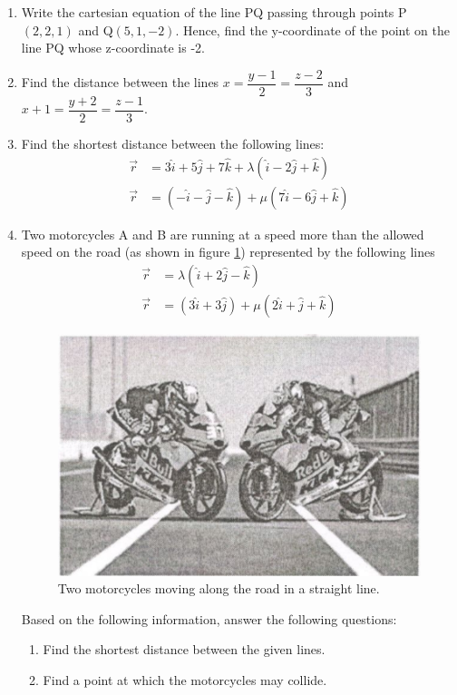\begin{enumerate}[label=\thesection.\arabic*.,ref=\thesection.\theenumi]
	\item Write the cartesian equation of the line PQ passing through points P$(2,2,1)$ and Q$(5,1,-2)$. Hence, find the y-coordinate of the point on the line PQ whose z-coordinate is -2.

	\item Find the distance between the lines $x=\dfrac{y-1}{2}=\dfrac{z-2}{3}$ and $x+1=\dfrac{y+2}{2}=\dfrac{z-1}{3}$.
	
	\item Find the shortest distance between the following lines:
		\begin{align}
			\vec{r}&=3\hat{i}+5\hat{j}+7\hat{k}+\lambda(\hat{i}-2\hat{j}+\hat{k})\\\vec{r}&=(-\hat{i}-\hat{j}-\hat{k})+\mu(7\hat{i}-6\hat{j}+\hat{k})
		\end{align}

	\item Two motorcycles A and B are running at a speed more than the allowed speed on the road (as shown in figure \ref{fig:bike1}) represented by the following lines 
		\begin{align}
			\vec{r}&=\lambda(\hat{i}+2\hat{j}-\hat{k})\\\vec{r}&=(3\hat{i}+3\hat{j})+\mu(2\hat{i}+\hat{j}+\hat{k})
		\end{align}
		\begin{figure}[H]
			\centering
			\includegraphics[width=\columnwidth]{figs/bike}
			\caption{Two motorcycles moving along the road in a straight line.}
			\label{fig:bike1}
		\end{figure}
		Based on the following information, answer the following questions:
		\begin{enumerate}
			\item Find the shortest distance between the given lines.
			\item Find a point at which the motorcycles may collide.
		\end{enumerate}
	

\end{enumerate}
